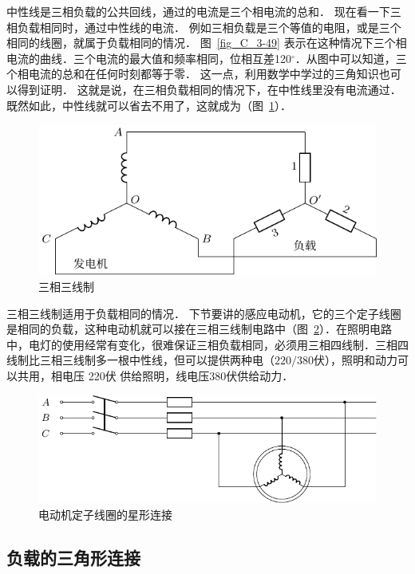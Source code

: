 中性线是三相负载的公共回线，通过的电流是三个相电流的总和．
现在看一下三相负载相同时，通过中性线的电流．
例如三相负载是三个等值的电阻，或是三个相同的线圈，就属于负载相同的情况．
图~\ref{fig_C_3-49} 表示在这种情况下三个相电流的曲线．三个电流的最大值和频率相同，位相互差120$^\circ$．从图中可以知道，三个相电流的总和在任何时刻都等于零．
这一点，利用数学中学过的三角知识也可以得到证明．
这就是说，在三相负载相同的情况下，在中性线里没有电流通过．
既然如此，中性线就可以省去不用了，这就成为（图~\ref{fig_C_3-50}）．


\begin{figure}[htbp]
\centering
\includegraphics{fig/C/3-50.pdf}
\caption{三相三线制}\label{fig_C_3-50}
\end{figure}

三相三线制适用于负载相同的情况．
下节要讲的感应电动机，它的三个定子线圈是相同的负载，这种电动机就可以接在三相三线制电路中（图~\ref{fig_C_3-51}）．在照明电路中，电灯的使用经常有变化，很难保证三相负载相同，必须用三相四线制．三相四线制比三相三线制多一根中性线，但可以提供两种电（$220/380$伏），照明和动力可以共用，相电压 220伏 供给照明，线电压380伏供给动力．
\begin{figure}[htbp]
    \centering
    \includegraphics{fig/C/3-51.pdf}
    \caption{电动机定子线圈的星形连接}\label{fig_C_3-51}
\end{figure}

\subsection{负载的三角形连接}

